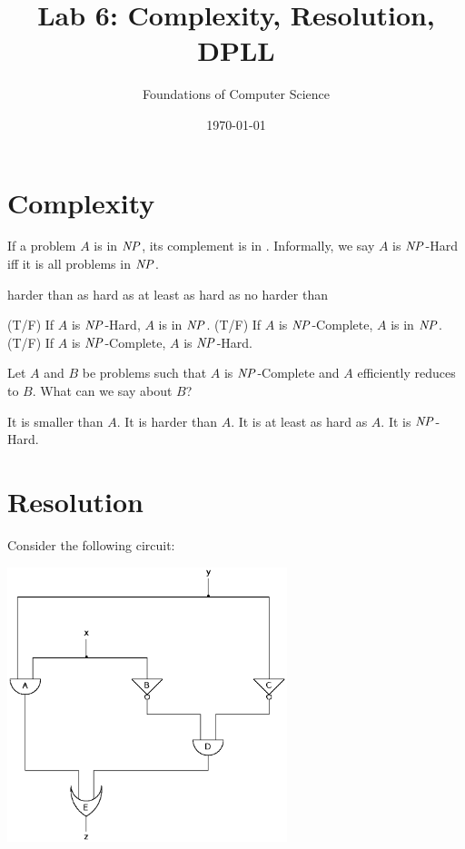 \documentclass[]{exam}
\title{Lab 6: Complexity, Resolution, DPLL}
\author{Foundations of Computer Science}
\date{\today}
\newcommand{\tf}[1][{}]{%
\fillin[#1][0.25in]%
}
\begin{document}
\maketitle

\setlength{\columnseprule}{1pt}
\begin{questions} 
\section*{Complexity}
\question If a problem $A$ is in $\mbox{\it NP\/}$, its complement is in \fillin[$\id{CoNP}$].
\question Informally, we say $A$ is $\mbox{\it NP\/}$-Hard iff it is \fillin all problems in $\mbox{\it NP\/}$.
\begin{checkboxes}
\choice harder than
\choice as hard as
\CorrectChoice at least as hard as
\choice no harder than
\end{checkboxes}

\question \tf[F] (T/F) If $A$ is $\mbox{\it NP\/}$-Hard, $A$ is in $\mbox{\it NP\/}$.
\question \tf[T] (T/F) If $A$ is $\mbox{\it NP\/}$-Complete, $A$ is in $\mbox{\it NP\/}$.
\question \tf[T] (T/F) If $A$ is $\mbox{\it NP\/}$-Complete, $A$ is $\mbox{\it NP\/}$-Hard.

\question Let $A$ and $B$ be problems such that $A$ is $\mbox{\it NP\/}$-Complete
and $A$ efficiently reduces to $B$. What can we say about $B$?
\begin{checkboxes}
\choice It is smaller than $A$.
\choice It is harder than $A$.
\CorrectChoice It is at least as hard as $A$.
\CorrectChoice It is $\mbox{\it NP\/}$-Hard.
\end{checkboxes}

\clearpage
\section*{Resolution}

\question Consider the following circuit:
\begin{center}
\includegraphics[height=8cm]{equiv_circuit.eps}%
\end{center}


\end{questions}
\end{document}
